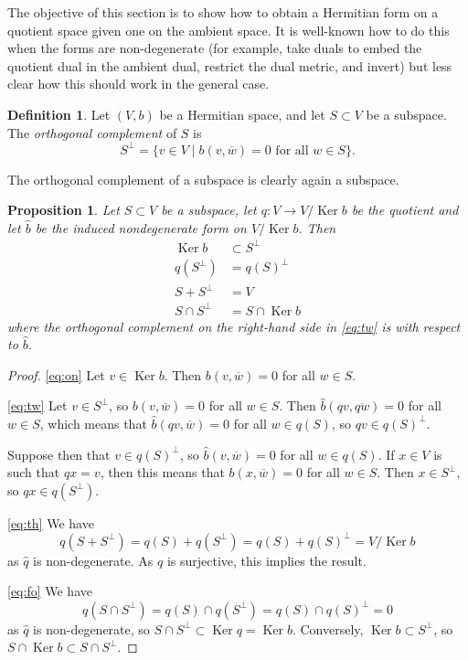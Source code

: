 \documentclass[10pt,a4paper]{amsart}
\newtheorem{prop}[theo]{Proposition}
\theoremstyle{definition}
\newtheorem{defi}[theo]{Definition}
\def\ov#1{\overline{#1}}
\DeclareMathOperator{\Ker}{Ker}
\begin{document}
The objective of this section is to show how to obtain a Hermitian form on a quotient space given one on the ambient space. It is well-known how to do this when the forms are non-degenerate (for example, take duals to embed the quotient dual in the ambient dual, restrict the dual metric, and invert) but less clear how this should work in the general case.


\begin{defi}
Let $(V,b)$ be a Hermitian space, and let $S \subset V$ be a subspace. The \emph{orthogonal complement} of $S$ is
\[
S^\perp = \{ v \in V \mid b(v, \ov w) = 0 \text{ for all $w \in S$}\}.
\]
\end{defi}

The orthogonal complement of a subspace is clearly again a subspace.

\begin{prop}
Let $S \subset V$ be a subspace, let $q : V \to V / \Ker b$ be the quotient and
let $\hat b$ be the induced nondegenerate form on $V / \Ker b$.
Then
\begin{align}
\label{eq:on}
\Ker b &\subset S^\perp
\\
\label{eq:tw}
q(S^\perp) &= q(S)^\perp
\\
\label{eq:th}
S + S^\perp &= V
\\
\label{eq:fo}
S \cap S^\perp &= S \cap \Ker b
\end{align}
where the orthogonal complement on the right-hand side in \eqref{eq:tw} is with respect to $\hat b$.
\end{prop}

\begin{proof}
\eqref{eq:on}\quad
Let $v \in \Ker b$. Then $b(v, \ov w) = 0$ for all $w \in S$.

\eqref{eq:tw}\quad
Let $v \in S^\perp$, so $b(v, \ov w) = 0$ for all $w \in S$. Then $\hat b(qv,
\ov{qw}) = 0$ for all $w \in S$, which means that $\hat b(qv, \ov w) = 0$ for
all $w \in q(S)$, so $qv \in q(S)^\perp$.

Suppose then that $v \in q(S)^\perp$, so $\hat b(v, \ov w) = 0$ for all $w \in
q(S)$. If $x \in V$ is such that $qx = v$, then this means that $b(x, \ov w) =
0$ for all $w \in S$. Then $x \in S^\perp$, so $qx \in q(S^\perp)$.

\eqref{eq:th}\quad
We have
\[
q(S + S^\perp)
= q(S) + q(S^\perp)
= q(S) + q(S)^\perp
= V / \Ker b
\]
as $\hat q$ is non-degenerate. As $q$ is surjective, this implies the result.

\eqref{eq:fo}\quad
We have
\[
q(S \cap S^\perp)
= q(S) \cap q(S^\perp)
= q(S) \cap q(S)^\perp
= 0
\]
as $\hat q$ is non-degenerate,
so $S \cap S^\perp \subset \Ker q = \Ker b$. Conversely, $\Ker b \subset S^\perp$, so $S \cap \Ker b \subset S \cap S^\perp$.
\end{proof}
\end{document}

